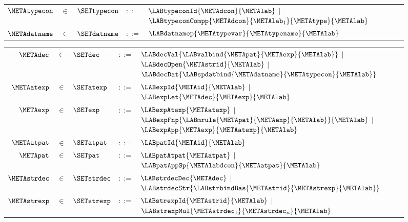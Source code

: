 \documentclass{jfp1}
\newcommand{\myfigure}{figure}
\newcommand{\sizeintables}{small}
\begin{document}
\begin{\myfigure}[t]
\begin{\sizeintables}
\begin{tabular}{rclrll}
$\METAtypecon$     & $\in$ & $\SETtypecon$     & $::=$  & $\LABtypeconId{\METAdcon}{\METAlab}$
                                                 $\mid$   $\LABtypeconCompp{\METAdcon}{\METAlab_1}{\METAtype}{\METAlab}$ &\\
$\METAdatname$     & $\in$ & $\SETdatname$     & $::=$  & $\LABdatnamep{\METAtypevar}{\METAtypename}{\METAlab}$&\\
\end{tabular}
\begin{tabular}{rclrll}
$\METAdec$         & $\in$ & $\SETdec$         & $::=$  & $\LABdecVal{\LABvalbind{\METApat}{\METAexp}{\METAlab}}$
                                                 $\mid$   $\LABdecOpen{\METAstrid}{\METAlab}$
                                                 $\mid$   $\LABdecDat{\LABspdatbind{\METAdatname}{\METAtypecon}{\METAlab}}$&\\
$\METAatexp$       & $\in$ & $\SETatexp$       & $::=$  & $\LABexpId{\METAid}{\METAlab}$
                                                 $\mid$   $\LABexpLet{\METAdec}{\METAexp}{\METAlab}$ &\\
$\METAexp$         & $\in$ & $\SETexp$         & $::=$  & $\LABexpAtexp{\METAatexp}$
                                                 $\mid$   $\LABexpFnp{\LABmrule{\METApat}{\METAexp}{\METAlab}}{\METAlab}$
                                                 $\mid$   $\LABexpApp{\METAexp}{\METAatexp}{\METAlab}$ &\\
$\METAatpat$       & $\in$ & $\SETatpat$       & $::=$  & $\LABpatId{\METAid}{\METAlab}$\\
$\METApat$         & $\in$ & $\SETpat$         & $::=$  & $\LABpatAtpat{\METAatpat}$
                                                 $\mid$   $\LABpatAppSp{\METAlabdcon}{\METAatpat}{\METAlab}$ &\\
$\METAstrdec$      & $\in$ & $\SETstrdec$      & $::=$  & $\LABstrdecDec{\METAdec}$
                                                 $\mid$   $\LABstrdecStr{\LABstrbindBas{\METAstrid}{\METAstrexp}{\METAlab}}$ &\\
$\METAstrexp$      & $\in$ & $\SETstrexp$      & $::=$  & $\LABstrexpId{\METAstrid}{\METAlab}$
                                                 $\mid$   $\LABstrexpMul{\METAstrdec_1}{\METAstrdec_n}{\METAlab}$&

\end{tabular}


\vspace*{0.04in}


\end{\sizeintables}
\end{\myfigure}
\end{document}
